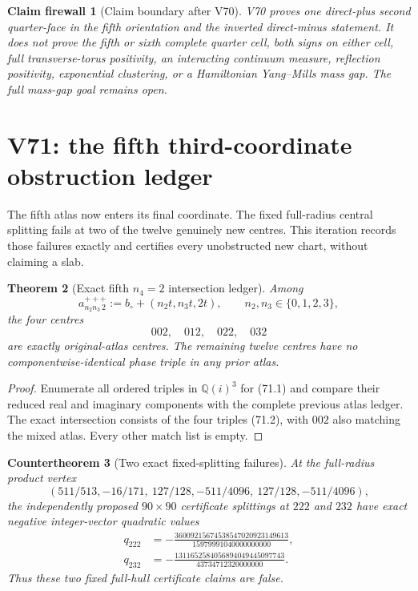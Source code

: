 \documentclass[11pt,oneside]{article}
\newtheorem{theorem}{Theorem}[section]
\newtheorem{firewall}[theorem]{Claim firewall}
\newtheorem{countertheorem}[theorem]{Countertheorem}
\theoremstyle{definition}
\theoremstyle{remark}
\begin{document}
\begin{firewall}[Claim boundary after V70]
\label{fire:newv70-final}
V70 proves one direct-plus second quarter-face in the fifth
orientation and the inverted direct-minus statement.  It does not
prove the fifth or sixth complete quarter cell, both signs on either
cell, full transverse-torus positivity, an interacting continuum
measure, reflection positivity, exponential clustering, or a
Hamiltonian Yang--Mills mass gap.  The full mass-gap goal remains
open.
\end{firewall}

\section{V71: the fifth third-coordinate obstruction ledger}
\label{sec:newv71-fifth-third-obstruction}

The fifth atlas now enters its final coordinate.  The fixed
full-radius central splitting fails at two of the twelve genuinely
new centres.  This iteration records those failures exactly and
certifies every unobstructed new chart, without claiming a slab.

\begin{theorem}[Exact fifth \(n_4=2\) intersection ledger]
\label{thm:newv71-intersections}
Among
\[
 a_{n_2n_3\,2}^{+++}
 :=b_\circ+(n_2t,n_3t,2t),
 \qquad n_2,n_3\in\{0,1,2,3\},                       \tag{71.1}
\]
the four centres
\[
 002,\quad012,\quad022,\quad032                      \tag{71.2}
\]
are exactly original-atlas centres.  The remaining twelve centres
have no componentwise-identical phase triple in any prior atlas.
\end{theorem}

\begin{proof}
Enumerate all ordered triples in \(\mathbb Q(i)^3\) for (71.1) and
compare their reduced real and imaginary components with the
complete previous atlas ledger.  The exact intersection consists
of the four triples (71.2), with \(002\) also matching the mixed
atlas.  Every other match list is empty.
\end{proof}

\begin{countertheorem}[Two exact fixed-splitting failures]
\label{ctr:newv71-two-failures}
At the full-radius product vertex
\[
 (511/513,-16/171,\ 127/128,-511/4096,\
   127/128,-511/4096),                                \tag{71.3}
\]
the independently proposed \(90\times90\) certificate splittings at
\(222\) and \(232\) have exact negative integer-vector quadratic
values
\[
\begin{aligned}
q_{222}&=
-\frac{36009215674538547020923149613}
 {15979991040000000000},\\
q_{232}&=
-\frac{1311652584056894049445097743}
 {43734712320000000}.
\end{aligned}                                         \tag{71.4}
\]
Thus these two fixed full-hull certificate claims are false.
\end{countertheorem}
\end{document}
